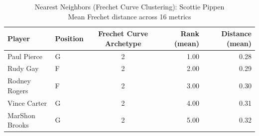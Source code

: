 \begin{table}[t]
\caption*{
{\fontsize{20}{25} Nearest Neighbors (Frechet Curve Clustering): Scottie Pippen\fontsize{12}{15}\selectfont } \\ 
{\fontsize{14}{17}\selectfont  Mean Frechet distance across 16 metrics\fontsize{12}{15}\selectfont }
} 
\fontsize{12.0pt}{14.0pt}\selectfont
\begin{tabular*}{\linewidth}{@{\extracolsep{\fill}}llcrr}
\toprule
Player & Position & Frechet Curve Archetype & Rank (mean) & Distance (mean) \\ 
\midrule\addlinespace[2.5pt]
Paul Pierce & G & 2 & 1.00 & 0.28 \\ 
Rudy Gay & F & 2 & 2.00 & 0.29 \\ 
Rodney Rogers & F & 2 & 3.00 & 0.30 \\ 
Vince Carter & G & 2 & 4.00 & 0.31 \\ 
MarShon Brooks & G & 2 & 5.00 & 0.32 \\ 
\bottomrule
\end{tabular*}
\end{table}

